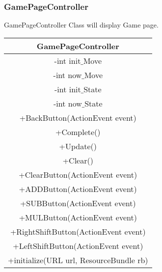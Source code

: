 \subsubsection{GamePageController}
GamePageController Class will display Game page.
\begin{center}\begin{tabular}{ |c| } \hline GamePageController \\ \hline  -int init$\_$Move \\ -int now$\_$Move \\ -int init$\_$State \\ -int now$\_$State \\ \hline +BackButton(ActionEvent event)\\ +Complete() \\ +Update() \\ +Clear() \\ +ClearButton(ActionEvent event) \\ +ADDButton(ActionEvent event) \\ +SUBButton(ActionEvent event) \\ +MULButton(ActionEvent event) \\ +RightShiftButton(ActionEvent event) \\ +LeftShiftButton(ActionEvent event) \\ +initialize(URL url, ResourceBundle rb) \\ \hline \end{tabular}\end{center}

